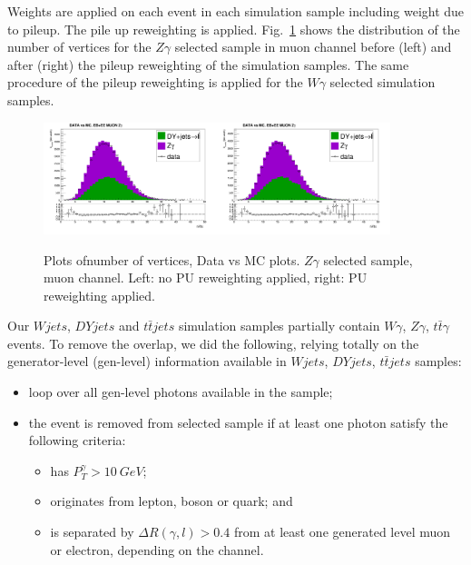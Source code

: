 
Weights are applied on each event in each simulation sample including weight due to pileup. The pile up reweighting is applied. Fig.~\ref{fig:DATAvsMC_nVtx} shows the distribution of the number of vertices for the $Z\gamma$ selected sample in muon channel before (left) and after (right) the pileup reweighting of the simulation samples. The same procedure of the pileup reweighting is applied for the $W\gamma$ selected simulation samples.

\begin{figure}[htb]
  \begin{center}
   \includegraphics[width=0.45\textwidth]{../figs/figs_v11/MUON_ZGamma/PrepareYields/c_TotalDATAvsMC_EtaCommon__nVtx_noPU.png}\includegraphics[width=0.45\textwidth]{../figs/figs_v11/MUON_ZGamma/PrepareYields/c_TotalDATAvsMC_EtaCommon__nVtx.png}
  \caption{Plots ofnumber of vertices, Data vs MC plots. $Z\gamma$ selected sample, muon channel. Left: no PU reweighting applied, right: PU reweighting applied. }
  \label{fig:DATAvsMC_nVtx}
  \end{center}
\end{figure}

Our $Wjets$, $DYjets$ and $t\bar{t}jets$ simulation samples partially contain $W\gamma$, $Z\gamma$, $t\bar{t}\gamma$ events. To remove the overlap, we did the following, relying totally on the generator-level (gen-level) information available in $Wjets$, $DYjets$, $t\bar{t}jets$ samples:
\begin{itemize}
  \item loop over all gen-level photons available in the sample;
  \item the event is removed from selected sample if at least one photon satisfy the following criteria:
  \begin{itemize}
     \item has $P_T^{\gamma}>10~GeV$;
     \item originates from lepton, boson or quark; and
     \item is separated by $\Delta R(\gamma,l)>0.4$ from at least one generated level muon or electron, depending on the channel.
  \end{itemize}
\end{itemize}

